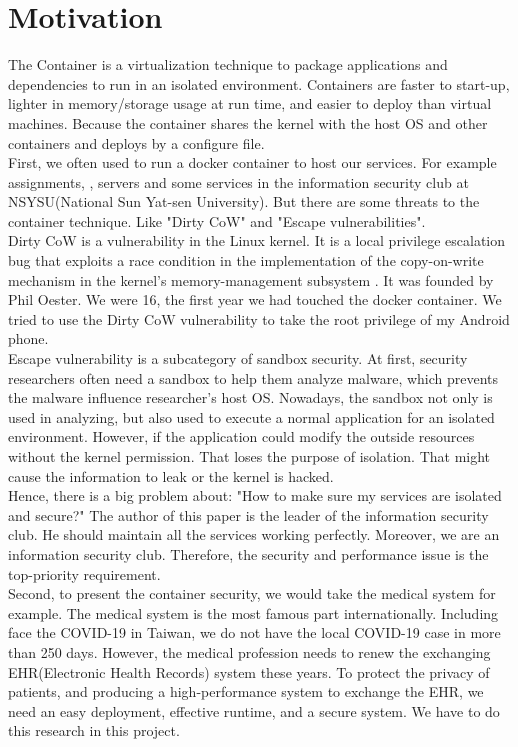\documentclass[12pt,a4paper]{article}
\begin{document}
\section{Motivation}
The Container is a virtualization technique to package applications and dependencies to run in
an isolated environment. Containers are faster to start-up, lighter in memory/storage usage
at run time, and easier to deploy than virtual machines. Because the container shares the
kernel with the host OS and other containers and deploys by a configure file.\\
First, we often used to run a docker container to host our services. For example assignments,
, servers and some services in the information security club at NSYSU(National Sun Yat-sen University).
But there are some threats to the container technique. Like "Dirty CoW" \cite{Dirty_CoW}
and "Escape vulnerabilities".\\
Dirty CoW is a vulnerability in the Linux kernel. It is a local privilege escalation bug
that exploits a race condition in the implementation of the copy-on-write mechanism in the
kernel's memory-management subsystem \cite{Dirty_CoW_wiki}. It was founded by Phil Oester. We
were 16, the first year we had touched the docker container. We tried to use the Dirty CoW
vulnerability to take the root privilege of my Android phone.\\
Escape vulnerability is a subcategory of sandbox security. At first, security researchers often
need a sandbox to help them analyze malware, which prevents the malware influence researcher's
host OS. Nowadays, the sandbox not only is used in analyzing, but also used to execute a
normal application for an isolated environment. However, if the application could modify the
outside resources without the kernel permission. That loses the purpose of isolation. That
might cause the information to leak or the kernel is hacked.\\
Hence, there is a big problem about: "How to make sure my services are isolated and secure?" The
author of this paper is the leader of the information security club. He should maintain all
the services working perfectly. Moreover, we are an information security club. Therefore,
the security and performance issue is the top-priority requirement.\\
Second, to present the container security, we would take the medical system for
example.
The medical system is the most famous part internationally. Including face the COVID-19
in Taiwan, we do not have the local COVID-19 case in more than 250 days. \cite{COVID19_CNN}
However, the medical profession needs to renew the exchanging EHR(Electronic Health Records)
system these years. To protect the privacy of patients, and producing a high-performance
system to exchange the EHR, we need an easy deployment, effective runtime, and a secure system.
We have to do this research in this project.
\end{document}
